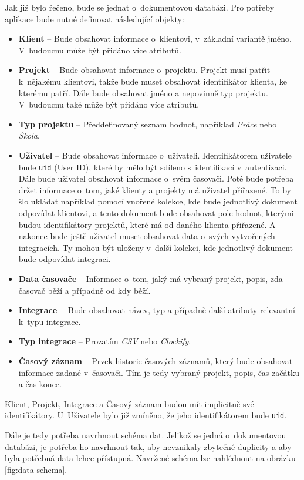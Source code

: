 Jak již bylo řečeno, bude se jednat o~dokumentovou databázi. Pro potřeby aplikace bude nutné definovat následující objekty:
\begin{itemize}
\item\textbf{Klient} – Bude obsahovat informace o~klientovi, v~základní variantě jméno. V~budoucnu může být přidáno více atributů.
\item\textbf{Projekt} – Bude obsahovat informace o~projektu. Projekt musí patřit k~nějakému klientovi, takže bude muset obsahovat identifikátor klienta, ke kterému patří. Dále bude obsahovat jméno a nepovinně typ projektu. V~budoucnu také může být přidáno více atributů.
\item\textbf{Typ projektu} – Předdefinovaný seznam hodnot, například \emph{Práce} nebo \emph{Škola}.
\item\textbf{Uživatel} – Bude obsahovat informace o~uživateli. Identifikátorem uživatele bude \texttt{uid} (User ID), které by mělo být sdíleno s~identifikací v~autentizaci. Dále bude uživatel obsahovat informace o~svém časovači. Poté bude potřeba držet informace o~tom, jaké klienty a projekty má uživatel přiřazené. To by šlo ukládat například pomocí vnořené kolekce, kde bude jednotlivý dokument odpovídat klientovi, a tento dokument bude obsahovat pole hodnot, kterými budou identifikátory projektů, které má od daného klienta přiřazené. A nakonec bude ještě uživatel muset obsahovat data o~svých vytvořených integracích. Ty mohou být uloženy v~další kolekci, kde jednotlivý dokument bude odpovídat integraci.
\item\textbf{Data časovače} – Informace o~tom, jaký má vybraný projekt, popis, zda časovač běží a případně od kdy běží.
\item\textbf{Integrace} – Bude obsahovat název, typ a případně další atributy relevantní k~typu integrace.
\item\textbf{Typ integrace} – Prozatím \emph{CSV} nebo \emph{Clockify}.
\item\textbf{Časový záznam} – Prvek historie časových záznamů, který bude obsahovat informace zadané v~časovači. Tím je tedy vybraný projekt, popis, čas začátku a čas konce.
\end{itemize}
Klient, Projekt, Integrace a Časový záznam budou mít implicitně své identifikátory. U~Uživatele bylo již zmíněno, že jeho identifikátorem bude \texttt{uid}.

Dále je tedy potřeba navrhnout schéma dat. Jelikož se jedná o~dokumentovou databázi, je potřeba ho navrhnout tak, aby nevznikaly zbytečné duplicity a aby byla potřebná data lehce přístupná. Navržené schéma lze nahlédnout na obrázku \ref{fig:data-schema}. 

